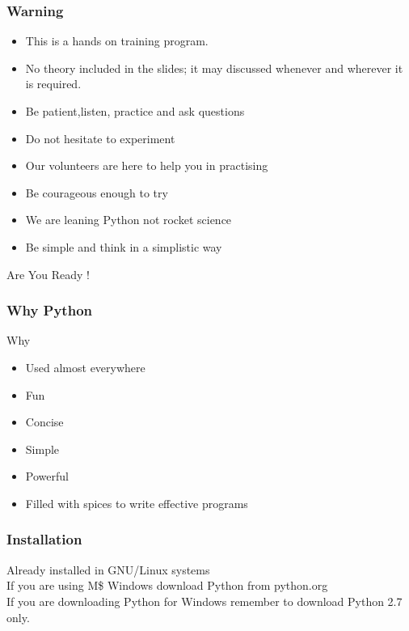 \documentclass{beamer}
\begin{document}
\begin{frame}
 \frametitle{Warning}
  \begin{itemize}
   \item This is a hands on training program.
   \item No theory included in the slides; it may discussed whenever and wherever it is required.
   \item Be patient,listen, practice and ask questions
   \item Do not hesitate to experiment 
   \item Our volunteers are here to help you in practising
   \item Be courageous enough to try 
   \item We are leaning Python not rocket science
   \item Be simple and think in a simplistic way
  \end{itemize}

\begin{alertblock}{}
Are You Ready !
\end{alertblock}


\end{frame}

\begin{frame}
 \frametitle{Why Python}
\begin{alertblock}{Why }
\begin{itemize}
 \item Used almost everywhere 
 \item Fun
 \item Concise
 \item Simple
 \item Powerful 
 \item Filled with spices to write effective programs
\end{itemize}

\end{alertblock}
\end{frame}


\begin{frame}
 \frametitle{Installation}
 \begin{block}{}
  Already installed in GNU/Linux systems \\
  If you are using M\$ Windows download Python from python.org \\
  If you are downloading Python for Windows remember to download Python 2.7 only.
 \end{block}
  
\end{frame}
\end{document}
